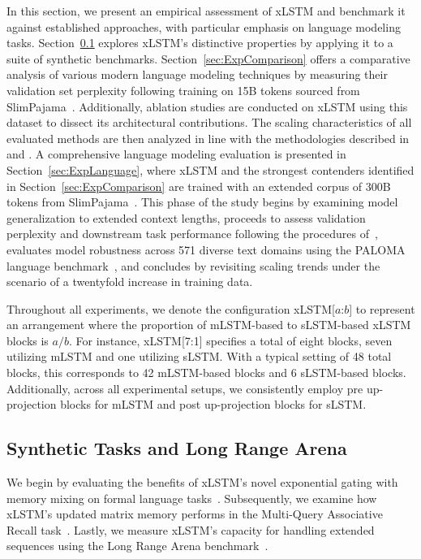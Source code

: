 In this section, we present an empirical assessment of xLSTM and benchmark it against established approaches, with particular emphasis on language modeling tasks. Section~\ref{sec:ExpSyntethic} explores xLSTM’s distinctive properties by applying it to a suite of synthetic benchmarks. 
Section~\ref{sec:ExpComparison} offers a comparative analysis of various modern language modeling techniques by measuring their validation set perplexity following training on 15B tokens sourced from SlimPajama~\citep{Soboleva:23}. Additionally, ablation studies are conducted on xLSTM using this dataset to dissect its architectural contributions. The scaling characteristics of all evaluated methods are then analyzed in line with the methodologies described in \citet{Kaplan:20} and \citet{Brown:20short}.
A comprehensive language modeling evaluation is presented in Section~\ref{sec:ExpLanguage}, where xLSTM and the strongest contenders identified in Section~\ref{sec:ExpComparison} are trained with an extended corpus of 300B tokens from SlimPajama~\citep{Soboleva:23}. This phase of the study begins by examining model generalization to extended context lengths, proceeds to assess validation perplexity and downstream task performance following the procedures of~\citep{Sutawika:24}, evaluates model robustness across 571 diverse text domains using the PALOMA language benchmark~\citep{Magnusson:23arxivshort}, and concludes by revisiting scaling trends under the scenario of a twentyfold increase in training data.

Throughout all experiments, we denote the configuration xLSTM[$a$:$b$] to represent an arrangement where the proportion of mLSTM-based to sLSTM-based xLSTM blocks is $a/b$. For instance, xLSTM[7:1] specifies a total of eight blocks, seven utilizing mLSTM and one utilizing sLSTM. With a typical setting of 48 total blocks, this corresponds to 42 mLSTM-based blocks and 6 sLSTM-based blocks. Additionally, across all experimental setups, we consistently employ pre up-projection blocks for mLSTM and post up-projection blocks for sLSTM.

\subsection{Synthetic Tasks and Long Range Arena}
\label{sec:ExpSyntethic}
We begin by evaluating the benefits of xLSTM's novel exponential gating with memory mixing on formal language tasks~\citep{Deletang:23}. Subsequently, we examine how xLSTM's updated matrix memory performs in the Multi-Query Associative Recall task~\citep{Arora:23arxiv}. Lastly, we measure xLSTM’s capacity for handling extended sequences using the Long Range Arena benchmark~\citep{Tay:21}.

